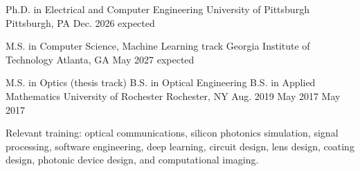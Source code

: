 
\begin{cventries}
  \cventry
    {Ph.D. in Electrical and Computer Engineering}
    {University of Pittsburgh}
    {Pittsburgh, PA}
    {Dec. 2026 expected}
    {}
\vspace{-0.4cm}

  \cventry
    {M.S. in Computer Science, Machine Learning track}
    {Georgia Institute of Technology}
    {Atlanta, GA}
    {May 2027 expected}
    {}
\vspace{-0.4cm}

  \cventry
    {M.S. in Optics (thesis track) \linebreak B.S. in Optical Engineering \linebreak B.S. in Applied Mathematics}
    {University of Rochester}
    {Rochester, NY}
    {Aug. 2019 \linebreak May 2017 \linebreak May 2017}
    {
      \begin{cvitems}
        \item {Relevant training: optical communications, silicon photonics simulation, signal processing, software engineering, deep learning, circuit design, lens design, coating design, photonic device design, and computational imaging.}
      \end{cvitems}
    }
\vspace{-0.45cm}
\end{cventries}
